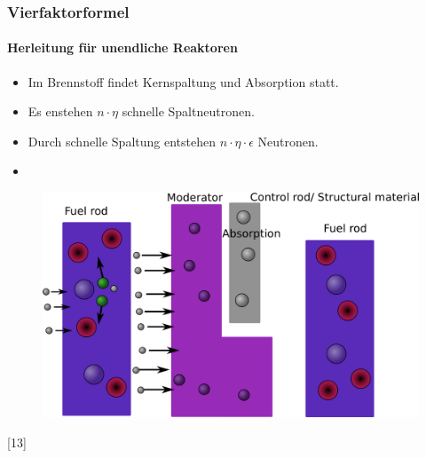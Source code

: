 \documentclass{beamer}[9pt]
\begin{document}
\begin{frame}
\frametitle{Vierfaktorformel}
\framesubtitle{Herleitung für unendliche Reaktoren}
\begin{itemize}
\item Im Brennstoff findet Kernspaltung und Absorption statt.
\item Es enstehen $n\cdot\eta$ schnelle Spaltneutronen.
\item Durch schnelle Spaltung entstehen $n\cdot\eta\cdot\epsilon$ Neutronen.
\item[]
\end{itemize}

\begin{figure}
\centering
\includegraphics[scale=.15]{thermal_reactor_2.png}
\end{figure}
\hspace{.5\textwidth}[13]
\end{frame}
\end{document}
